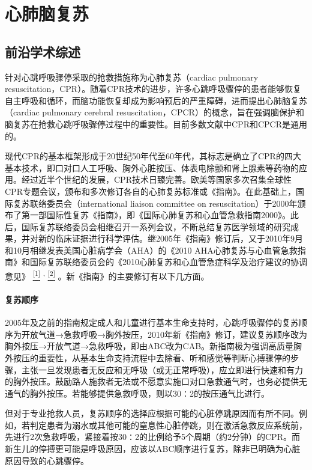 \chapter{心肺脑复苏}

\section{前沿学术综述}

针对心跳呼吸骤停采取的抢救措施称为心肺复苏（cardiac pulmonary
resuscitation，CPR）。随着CPR技术的进步，许多心跳呼吸骤停的患者能够恢复自主呼吸和循环，而脑功能恢复却成为影响预后的严重障碍，进而提出心肺脑复苏（cardiac
pulmonary cerebral
resuscitation，CPCR）的概念，旨在强调脑保护和脑复苏在抢救心跳呼吸骤停过程中的重要性。目前多数文献中CPR和CPCR是通用的。

现代CPR的基本框架形成于20世纪50年代至60年代，其标志是确立了CPR的四大基本技术，即口对口人工呼吸、胸外心脏按压、体表电除颤和肾上腺素等药物的应用。经过近半个世纪的发展，CPR技术日臻完善。欧美等国家多次召集全球性CPR专题会议，颁布和多次修订各自的心肺复苏标准或《指南》。在此基础上，国际复苏联络委员会（international
liaison committee on
resuscitation）于2000年颁布了第一部国际性复苏《指南》，即《国际心肺复苏和心血管急救指南2000》。此后，国际复苏联络委员会相继召开一系列会议，不断总结复苏医学领域的研究成果，并对新的临床证据进行科学评估。继2005年《指南》修订后，又于2010年9月和10月相继发表美国心脏病学会（AHA）的《2010
AHA心肺复苏与心血管急救指南》和国际复苏联络委员会的《2010心肺复苏和心血管急症科学及治疗建议的协调意见》
\protect\hyperlink{text00023.htmlux5cux23ch1-22}{\textsuperscript{{[}1{]}}}
\textsuperscript{,}
\protect\hyperlink{text00023.htmlux5cux23ch2-22}{\textsuperscript{{[}2{]}}}
。新《指南》的主要修订有以下几方面。

\subsubsection{复苏顺序}

2005年及之前的指南规定成人和儿童进行基本生命支持时，心跳呼吸骤停的复苏顺序为开放气道→急救呼吸→胸外按压，2010年新《指南》修订，建议复苏顺序改为胸外按压→开放气道→急救呼吸，即由ABC改为CAB。新指南极为强调高质量胸外按压的重要性，从基本生命支持流程中去除看、听和感觉等判断心搏骤停的步骤，主张一旦发现患者无反应和无呼吸（或无正常呼吸），应立即进行快速和有力的胸外按压。鼓励路人施救者无法或不愿意实施口对口急救通气时，也务必提供无通气的胸外按压。若能够提供急救呼吸，则以30∶2的按压通气比进行。

但对于专业抢救人员，复苏顺序的选择应根据可能的心脏停跳原因而有所不同。例如，若判定患者为溺水或其他可能的窒息性心脏停跳，则在激活急救反应系统前，先进行2次急救呼吸，紧接着按30∶2的比例给予5个周期（约2分钟）的CPR。而新生儿的停搏更可能是呼吸原因，应该以ABC顺序进行复苏，除非已明确为心脏原因导致的心跳骤停。

